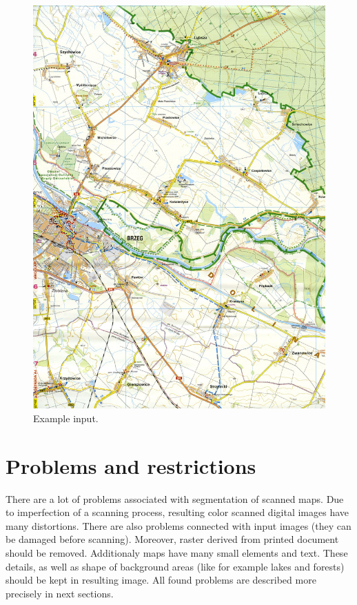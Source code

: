 \documentclass[a4paper,onecolumn,oneside,12pt]{memoir}
\begin{document}
\begin{figure}[!ht]
\begin{center}
\includegraphics[scale=0.78]{images/brzeg.jpg}
\caption{Example input.}
\label{inputExample}
\end{center}
\end{figure}

\section{Problems and restrictions}

There are a lot of problems associated with segmentation of scanned maps. Due to imperfection of
a scanning process, resulting color scanned digital images have many distortions. There are also
problems connected with input images (they can be damaged before scanning). Moreover, raster derived
from printed document should be removed. Additionaly maps have many small elements and text. These
details, as well as shape of background areas (like for example lakes and forests) should be kept in
resulting image. All found problems are described more precisely in next sections.
\end{document}

